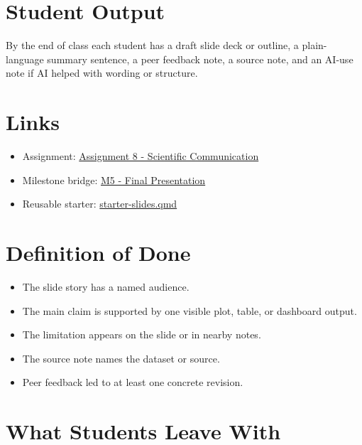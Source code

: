 \documentclass[
  letterpaper,
  DIV=11,
  numbers=noendperiod,
  oneside]{scrreprt}
\providecommand{\tightlist}{%
  \setlength{\itemsep}{0pt}\setlength{\parskip}{0pt}}
\begin{document}
\section*{Student Output}\label{student-output-6}


By the end of class each student has a draft slide deck or outline, a
plain-language summary sentence, a peer feedback note, a source note,
and an AI-use note if AI helped with wording or structure.

\section*{Links}\label{links-3}


\begin{itemize}
\tightlist
\item
  Assignment:
  \href{../../assignments/assignment08-communication/README.md}{Assignment
  8 - Scientific Communication}
\item
  Milestone bridge: \href{../../milestones/m5-presentation/README.md}{M5
  - Final Presentation}
\item
  Reusable starter: \url{starter-slides.qmd}
\end{itemize}

\section*{Definition of Done}\label{definition-of-done-5}


\begin{itemize}
\tightlist
\item
  The slide story has a named audience.
\item
  The main claim is supported by one visible plot, table, or dashboard
  output.
\item
  The limitation appears on the slide or in nearby notes.
\item
  The source note names the dataset or source.
\item
  Peer feedback led to at least one concrete revision.
\end{itemize}

\section*{What Students Leave With}\label{what-students-leave-with-4}
\end{document}
